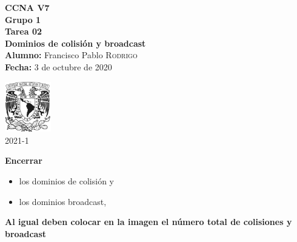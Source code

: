 \documentclass{article}
\newcommand{\materia}{CCNA V7}
\newcommand{\grupo}{1}
\newcommand{\semestre}{2021-1}
\newcommand{\alumno}{Francisco Pablo \textsc{Rodrigo}}
\newcommand{\actividad}{Tarea 02}
\newcommand{\titulo}{Dominios de colisión y broadcast}
\newcommand{\fechaEntrega}{3 de octubre de 2020}
\begin{document}
\begin{minipage}[t]{0.7\linewidth}
    \vspace{-1cm}
    \large{\textbf{\materia}}\\
    \large{\textbf{Grupo \grupo}}\\
    \textbf{\actividad}\\
    \textbf{\titulo} \\

    \large{\textbf{Alumno:} \alumno} \\
    \textbf{Fecha:} \fechaEntrega%
\end{minipage}\hfill
\begin{minipage}[t]{0.2\linewidth}
    \vspace{-1.2cm}
    \begin{flushright}
        \includegraphics[width=2cm]{unam.jpg}\\
        \large{\semestre}    
    \end{flushright}
\end{minipage}
\vspace{5mm}

\textbf{Encerrar}
\begin{itemize}
    \item los dominios de colisión y 
    \item los dominios broadcast, 
\end{itemize}
\textbf{Al igual deben colocar en la imagen el número total de colisiones y 
broadcast}
\end{document}
